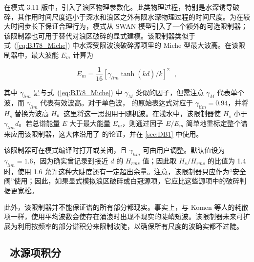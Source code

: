在模式 3.11 版中，引入了浪区物理参数化。此类物理过程，特别是水深诱导破碎，其作用时间尺度远小于深水和浪区之外有限水深物理过程的时间尺度。为在较大时间步长下保证合理行为，模式从 SWAN 模型引入了一个额外的可选限制器；该限制器也可用于替代对浪区破碎的显式建模。该限制器类似于式~(\ref{eq:BJ78_Miche}) 中水深受限波浪破碎源项里的 Miche 型最大波高。在该限制器中，最大波能 $E_m$ 计算为


\begin{equation}
E_m = \frac{1}{16} [ \gamma_{lim}  \tanh ( \bar{k} d ) / \bar{k} ] ^2
\:\:\: , \label{eq:MLIM} 
\end{equation}

\noindent
其中 $\gamma_{lim}$ 是与式~(\ref{eq:BJ78_Miche}) 中 $\gamma_M$ 类似的因子，但需注意 $\gamma_M$ 代表单个波，而 $\gamma_{lim}$ 代表有效波高。对于单色波，\cite{art:Miche44} 的原始表达式对应于 $\gamma_{lim} = 0.94$，并将 $H_s$ 替换为波高 $H$。这里将这一思想用于随机波。在浅水中，该限制器使 $H_s$ 小于 $\gamma_{lim} d$。若总谱能量 $E$ 大于最大能量 $E_m$，则通过因子 $E/E_m$ 简单地重标定整个谱来应用该限制器，这大体沿用了 \cite{art:EB96} 的论证，并在 \para\ref{sec:DB1} 中使用。

该限制器可在模式编译时打开或关闭，且 $\gamma_{lim}$ 可由用户调整。默认值设为 $\gamma_{lim} = 1.6$，因为确实曾记录到接近 $d$ 的 $H_{rms}$ 值；因此取 $H_s/H_{rms}$ 的比值为 1.4 时，使用 1.6 允许这种大陡度还有一定超出余量。注意，该限制器只应作为“安全阀”使用；因此，如果显式模拟浪区破碎或白冠源项，它应比这些源项中的破碎判据更宽松。

此外，该限制器并不能保证谱的所有部分都现实。事实上，与 Komen 等人的耗散项一样，使用平均波数会使存在涌浪时出现不现实的陡峭短波。该限制器未来可扩展为利用按频率的部分谱积分来限制波陡，以确保所有尺度的波确实都不过陡。

\vssub
\subsection{~冰源项积分} \label{sub:icesource}
\vssub

